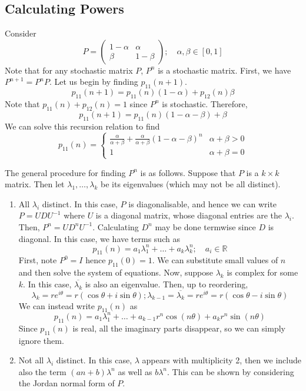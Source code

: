 \subsection{Calculating Powers}
\begin{example}
	Consider
	\[
		P = \begin{pmatrix}
			1-\alpha & \alpha \\ \beta & 1-\beta
		\end{pmatrix};\quad \alpha, \beta \in [0,1]
	\]
	Note that for any stochastic matrix \( P \), \( P^n \) is a stochastic matrix.
	First, we have \( P^{n+1} = P^n P \).
	Let us begin by finding \( p_{11}(n+1) \).
	\[
		p_{11}(n+1) = p_{11}(n)(1-\alpha) + p_{12}(n)\beta
	\]
	Note that \( p_{11}(n) + p_{12}(n) = 1 \) since \( P^n \) is stochastic.
	Therefore,
	\[
		p_{11}(n+1) = p_{11}(n)(1-\alpha-\beta) + \beta
	\]
	We can solve this recursion relation to find
	\[
		p_{11}(n) = \begin{cases}
			\frac{\alpha}{\alpha + \beta} + \frac{\alpha}{\alpha + \beta}(1-\alpha-\beta)^n & \alpha + \beta > 0 \\
			1                                                                               & \alpha + \beta = 0\end{cases}
	\]
\end{example}
The general procedure for finding \( P^n \) is as follows.
Suppose that \( P \) is a \( k \times k \) matrix.
Then let \( \lambda_1, \dots, \lambda_k \) be its eigenvalues (which may not be all distinct).
\begin{enumerate}[(1)]
	\item All \( \lambda_i \) distinct.
	      In this case, \( P \) is diagonalisable, and hence we can write \( P = U D U^{-1} \) where \( U \) is a diagonal matrix, whose diagonal entries are the \( \lambda_i \).
	      Then, \( P^n = U D^n U^{-1} \).
	      Calculating \( D^n \) may be done termwise since \( D \) is diagonal.
	      In this case, we have terms such as
	      \[
		      p_{11}(n) = a_1 \lambda_1^n + \dots + a_k \lambda_k^n; \quad a_i \in \mathbb R
	      \]
	      First, note \( P^0 = I \) hence \( p_{11}(0) = 1 \).
	      We can substitute small values of \( n \) and then solve the system of equations.
	      Now, suppose \( \lambda_k \) is complex for some \( k \).
	      In this case, \( \overline{\lambda_k} \) is also an eigenvalue.
	      Then, up to reordering,
	      \[
		      \lambda_k = re^{i\theta} = r(\cos \theta + i \sin \theta); \lambda_{k-1} = \overline{\lambda_k} = re^{i\theta} = r(\cos \theta - i \sin \theta)
	      \]
	      We can instead write \( p_{11}(n) \) as
	      \[
		      p_{11}(n) = a_1 \lambda_1^n + \dots + a_{k-1} r^n \cos (n\theta) + a_k r^n \sin (n\theta)
	      \]
	      Since \( p_{11}(n) \) is real, all the imaginary parts disappear, so we can simply ignore them.
	\item Not all \( \lambda_i \) distinct.
	      In this case, \( \lambda \) appears with multiplicity 2, then we include also the term \( (an + b) \lambda^n \) as well as \( b \lambda^n \).
	      This can be shown by considering the Jordan normal form of \( P \).
\end{enumerate}
